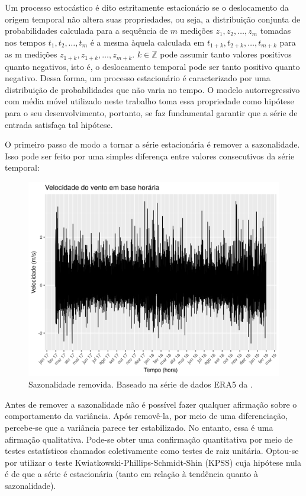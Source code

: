 \documentclass[
	12pt,				%
	openright,			%
	oneside,			%
	a4paper,			%
	english,			%
	french,				%
	spanish,			%
	brazil				%
	]{abntex2}
\begin{document}
Um processo estocástico é dito estritamente estacionário se o deslocamento da origem temporal não altera suas propriedades, ou seja, a distribuição conjunta de probabilidades calculada para a sequência de $m$ medições $z_1,z_2,\dots,z_m$ tomadas nos tempos $t_1, t_2, \dots, t_m$ é a mesma àquela calculada em $t_{1+k}, t_{2+k}, \dots, t_{m+k}$ para as m medições $z_{1+k},z_{1+k},\dots,z_{m+k}$. $k\in\mathbb{Z}$ pode assumir tanto valores positivos quanto negativos, isto é, o deslocamento temporal pode ser tanto positivo quanto negativo. Dessa forma, 
um processo estacionário é caracterizado por uma distribuição de probabilidades que não varia no tempo. O modelo autorregressivo com média móvel utilizado neste trabalho toma essa propriedade como hipótese para o seu desenvolvimento, portanto, se faz fundamental garantir que a série de entrada satisfaça tal hipótese.

O primeiro passo de modo a tornar a série estacionária é remover a sazonalidade. Isso pode ser feito por uma simples diferença entre valores consecutivos da série temporal:

\begin{figure}[h]
    \centering
	\includegraphics[width=\textwidth]{entire_series_hourly_basis_seasonless.png}
	\caption{Sazonalidade removida. Baseado na série de dados ERA5 da \cite{era5}.}
\end{figure}
\FloatBarrier

Antes de remover a sazonalidade não é possível fazer qualquer afirmação sobre o comportamento da variância. Após removê-la, por meio de uma diferenciação, percebe-se que a variância parece ter estabilizado. No entanto, essa é uma afirmação qualitativa. Pode-se obter uma confirmação quantitativa por meio de testes estatísticos chamados coletivamente como testes de raiz unitária. Optou-se por utilizar o teste Kwiatkowski-Phillips-Schmidt-Shin (KPSS) \cite{kpss} cuja hipótese nula é de que a série é estacionária (tanto em relação à tendência quanto à sazonalidade).
\end{document}
